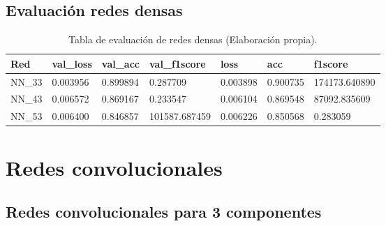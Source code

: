 \subsection{Evaluaci\'{o}n redes densas}

\begin{table}[H]
\centering
\begin{tabular}{|l|l|l|l|l|l|l|}
\hline
\textbf{Red} & \textbf{val\_loss} & \textbf{val\_acc} & \textbf{val\_f1score} & \textbf{loss} & \textbf{acc} & \textbf{f1score} \\ \hline
NN\_33 & 0.003956 & 0.899894 & 0.287709 & 0.003898 & 0.900735 & 174173.640890 \\ \hline
NN\_43 & 0.006572 & 0.869167 & 0.233547 & 0.006104 & 0.869548 & 87092.835609 \\ \hline
NN\_53 & 0.006400 & 0.846857 & 101587.687459 & 0.006226 & 0.850568 & 0.283059 \\ \hline
\end{tabular}
\caption{Tabla de evaluaci\'{o}n de redes densas (Elaboraci\'{o}n propia).}
\label{table:evaluacion_nn}
\end{table}

\section{Redes convolucionales}


\subsection{Redes convolucionales para 3 componentes}

